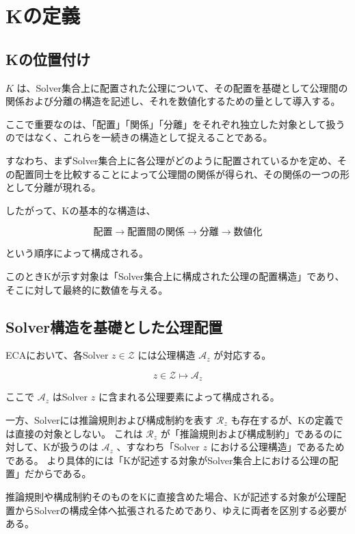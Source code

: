 \section{Kの定義}

\subsection{Kの位置付け}

$K$ は、Solver集合上に配置された公理について、その配置を基礎として公理間の関係および分離の構造を記述し、それを数値化するための量として導入する。

ここで重要なのは、「配置」「関係」「分離」をそれぞれ独立した対象として扱うのではなく、これらを一続きの構造として捉えることである。

すなわち、まずSolver集合上に各公理がどのように配置されているかを定め、その配置同士を比較することによって公理間の関係が得られ、その関係の一つの形として分離が現れる。

したがって、Kの基本的な構造は、

\[
\text{配置}
\longrightarrow
\text{配置間の関係}
\longrightarrow
\text{分離}
\longrightarrow
\text{数値化}
\]

という順序によって構成される。

このときKが示す対象は「Solver集合上に構成された公理の配置構造」であり、そこに対して最終的に数値を与える。

\subsection{Solver構造を基礎とした公理配置}

ECAにおいて、各Solver $z\in\mathcal{Z}$ には公理構造 $\mathcal{A}_z$ が対応する。

\[
z\in\mathcal{Z}
\longmapsto
\mathcal{A}_z
\]

ここで $\mathcal{A}_z$ はSolver $z$ に含まれる公理要素によって構成される。

一方、Solverには推論規則および構成制約を表す $\mathcal{R}_z$ も存在するが、Kの定義では直接の対象としない。
これは $\mathcal{R}_z$ が「推論規則および構成制約」であるのに対して、Kが扱うのは $\mathcal{A}_z$ 、すなわち「Solver $z$ における公理構造」であるためである。
より具体的には「Kが記述する対象がSolver集合上における公理の配置」だからである。

推論規則や構成制約そのものをKに直接含めた場合、Kが記述する対象が公理配置からSolverの構成全体へ拡張されるためであり、ゆえに両者を区別する必要がある。

